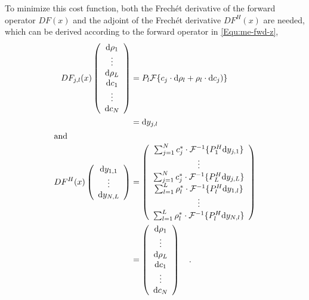 To minimize this cost function, both the Frech\'et derivative of the forward operator $DF(x)$ and the adjoint of the Frech\'et derivative $DF^H (x)$ are needed, which can be derived according to the forward operator in \cref{Equ:me-fwd-z},
\begin{align}
  DF_{j,l}(x) \left( \begin{array}{c}
    \text{d} \rho_1 \\
    \vdots \\
    \text{d} \rho_L \\
    \text{d} c_1 \\
    \vdots \\
    \text{d} c_N
  \end{array} \right) 
  &= P_{l} \mathcal{F} \{c_j \cdot \text{d} \rho_l + \rho_l \cdot \text{d} c_j) \} \\
  &= \text{d} y_{j,l} \\
\intertext{and}
  DF^{H}(x) \left( \begin{array}{c}
    \text{d} y_{1,1} \\
    \vdots \\
    \text{d} y_{N,L}
  \end{array} \right) 
  &= \left( \begin{array}{c}
    \sum_{j=1}^{N} c_j^* \cdot \mathcal{F}^{-1} \{ P_1^H \text{d} y_{j,1} \} \\
    \vdots \\
    \sum_{j=1}^{N} c_j^* \cdot \mathcal{F}^{-1} \{ P_L^H \text{d} y_{j,L} \} \\
    \sum_{l=1}^{L} \rho_l^* \cdot \mathcal{F}^{-1} \{ P_l^H \text{d} y_{1,l} \} \\
    \vdots \\
    \sum_{l=1}^{L} \rho_l^* \cdot \mathcal{F}^{-1} \{ P_l^H \text{d} y_{N,l} \} 
  \end{array} \right) \\
  &= \left( \begin{array}{c}
    \text{d} \rho_1 \\
    \vdots \\
    \text{d} \rho_L \\
    \text{d} c_1 \\
    \vdots \\
    \text{d} c_N
  \end{array} \right) \quad .
\end{align}

